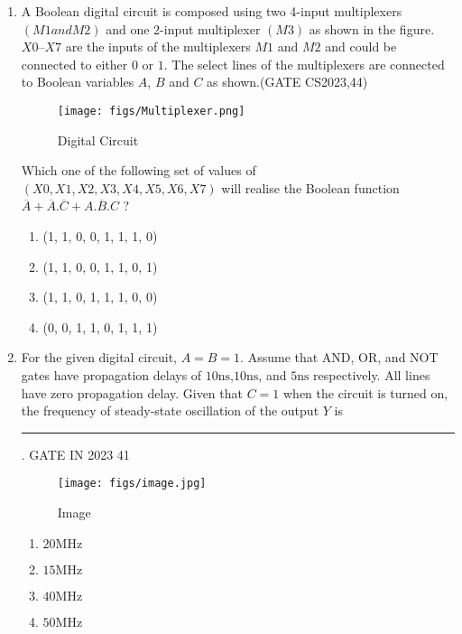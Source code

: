 \begin{enumerate}
\item A Boolean digital circuit is composed using two 4-input multiplexers $(M1 and M2)$ and one 2-input multiplexer $(M3)$ as shown in the figure. $X0$–$X7$ are the inputs of the multiplexers $M1$ and $M2$ and could be connected to either $0$ or $1$. The select lines of the multiplexers are connected to Boolean variables $A$, $B$ and $C$ as shown.\hfill(GATE CS2023,44)

\begin{figure}[H]
    \centering
        \texttt{[image: figs/Multiplexer.png]}
    \caption{Digital Circuit}
    \label{fig:Multiplexer}
\end{figure}

Which one of the following set of values of $(X0, X1, X2, X3, X4, X5, X6, X7)$ will realise the Boolean function 
$\overline{A} + \overline{A}.\overline{C}+A.\overline{B}.C $ ?
 \begin{enumerate}
     \item (1, 1, 0, 0, 1, 1, 1, 0)
     \item (1, 1, 0, 0, 1, 1, 0, 1)
     \item (1, 1, 0, 1, 1, 1, 0, 0)
     \item (0, 0, 1, 1, 0, 1, 1, 1)
 \end{enumerate}
\item For the given digital circuit, $A = B = 1$. Assume that AND, OR, and NOT gates have propagation delays of $10\mathrm{ns}$,$10\mathrm{ns}$, and $5\mathrm{ns}$ respectively. All lines have zero
propagation delay. Given that $C = 1$ when the circuit is turned on, the frequency of steady-state oscillation of the output $Y$  is  \rule{30pt}{1pt}.
\hfill{GATE IN 2023 41}
\begin{figure}[!h]
        \centering  
        
        \texttt{[image: figs/image.jpg]}
        \caption{Image}
        
\end{figure}
    \begin{enumerate}
        \item $20 \mathrm{MHz}$
        \item $15 \mathrm{MHz}$
        \item $40 \mathrm{MHz}$
        \item $50 \mathrm{MHz}$
    \end{enumerate}
 
\end{enumerate}

